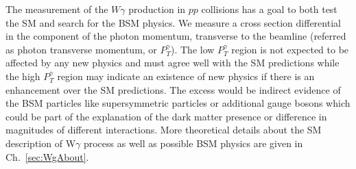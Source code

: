 The measurement of the $W\gamma$ production in $pp$ collisions has a goal to both test the SM and search for the BSM physics. We measure a cross section differential in the component of the photon momentum, transverse to the beamline (referred as photon transverse momentum, or $P_T^{\gamma}$). The low $P_T^{\gamma}$ region is not expected to be affected by any new physics and must agree well with the SM predictions while the high $P_T^{\gamma}$ region may indicate an existence of new physics if there is an enhancement over the SM predictions. The excess would be indirect evidence of the BSM particles like supersymmetric particles or additional gauge bosons which could be part of the explanation of the dark matter presence or difference in magnitudes of different interactions. More theoretical details about the SM description of W$\gamma$ process as well as possible BSM physics are given in Ch.~\ref{sec:WgAbout}.    


